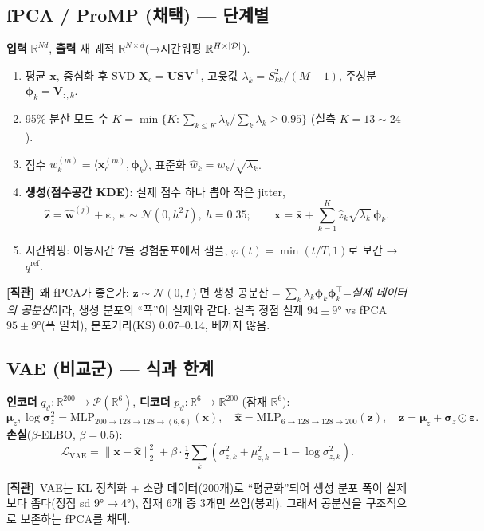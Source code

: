 \documentclass[11pt]{article}
\renewcommand{\vec}[1]{\mathbf{#1}}
\newcommand{\R}{\mathbb{R}}
\newcommand{\qref}{q^{\mathrm{ref}}}
\newcommand{\intuition}[1]{\par\smallskip\noindent\textbf{[직관]}\ #1\par\smallskip}
\begin{document}
\subsection{fPCA / ProMP (채택) --- 단계별}
\textbf{입력} $\R^{Nd}$, \textbf{출력} 새 궤적 $\R^{N\times d}$(→시간워핑 $\R^{H\times|\Dset|}$).
\begin{enumerate}
\item 평균 $\bar{\vec x}$, 중심화 후 SVD $\mathbf X_c=\mathbf U\mathbf S\mathbf V^\top$, 고윳값 $\lambda_k=S_{kk}^2/(M{-}1)$, 주성분 $\boldsymbol\phi_k=\mathbf V_{:,k}$.
\item 95\% 분산 모드 수 $K=\min\{K:\sum_{k\le K}\lambda_k/\sum_k\lambda_k\ge0.95\}$ (실측 $K{=}13\!\sim\!24$).
\item 점수 $w_k^{(m)}=\langle\vec x_c^{(m)},\boldsymbol\phi_k\rangle$, 표준화 $\hat w_k=w_k/\sqrt{\lambda_k}$.
\item \textbf{생성(점수공간 KDE)}: 실제 점수 하나 뽑아 작은 jitter,
\begin{equation}
\hat{\vec z}=\hat{\vec w}^{(j)}+\boldsymbol\varepsilon,\ \boldsymbol\varepsilon\sim\mathcal N(0,h^2I),\ h{=}0.35;\qquad
\hat{\vec x}=\bar{\vec x}+\sum_{k=1}^{K}\hat z_k\sqrt{\lambda_k}\,\boldsymbol\phi_k.
\end{equation}
\item 시간워핑: 이동시간 $T$를 경험분포에서 샘플, $\varphi(t)=\min(t/T,1)$로 보간 → $\qref$.
\end{enumerate}
\intuition{왜 fPCA가 좋은가: $\hat{\vec z}\sim\mathcal N(0,I)$면 생성 공분산$=\sum_k\lambda_k\boldsymbol\phi_k\boldsymbol\phi_k^\top$=\emph{실제 데이터의 공분산}이라, 생성 분포의 ``폭''이 실제와 같다. 실측 정점 실제 $94{\pm}9°$ vs fPCA $95{\pm}9°$(폭 일치), 분포거리(KS) 0.07--0.14, 베끼지 않음.}

\subsection{VAE (비교군) --- 식과 한계}
\textbf{인코더} $q_\vartheta:\R^{200}\!\to\!\mathcal P(\R^6)$, \textbf{디코더} $p_\vartheta:\R^6\!\to\!\R^{200}$ (잠재 $\R^6$):
\begin{equation}
\boldsymbol\mu_z,\log\boldsymbol\sigma_z^2=\mathrm{MLP}_{200\to128\to128\to(6,6)}(\vec x),\quad
\hat{\vec x}=\mathrm{MLP}_{6\to128\to128\to200}(\vec z),\quad \vec z=\boldsymbol\mu_z+\boldsymbol\sigma_z\odot\boldsymbol\varepsilon.
\end{equation}
\textbf{손실}($\beta$-ELBO, $\beta{=}0.5$):
\begin{equation}
\mathcal L_{\mathrm{VAE}}=\|\vec x-\hat{\vec x}\|_2^2+\beta\cdot\tfrac12\textstyle\sum_k(\sigma_{z,k}^2+\mu_{z,k}^2-1-\log\sigma_{z,k}^2).
\end{equation}
\intuition{VAE는 KL 정칙화 + 소량 데이터(200개)로 ``평균화''되어 생성 분포 폭이 실제보다 좁다(정점 sd $9°\!\to\!4°$), 잠재 6개 중 3개만 쓰임(붕괴). 그래서 공분산을 구조적으로 보존하는 fPCA를 채택.}
\end{document}
